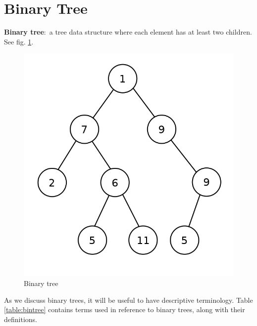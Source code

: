 \documentclass[nobib]{tufte-handout}
\newcommand{\defn}[2]{\noindent\textbf{#1}:\ #2}
\begin{document}
\section{Binary Tree}
\defn{Binary tree}{a tree data structure where each 
element has at least two children. See fig. \ref{fig:bintree}.}
\begin{figure}
   \center 
   \caption{Binary tree}
   \label{fig:bintree}
   \includegraphics{images/Binary_tree_v2.svg.png}
\end{figure}
As we discuss binary trees, it will be useful to have descriptive
terminology. Table \ref{table:bintree} contains terms used in reference
to binary trees, along with their definitions. 
\end{document}
